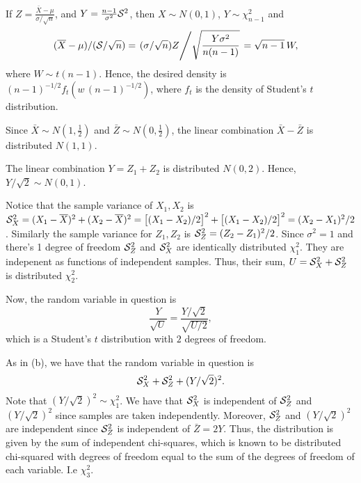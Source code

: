 \documentclass{stat_homework}
\begin{document}

If $Z = \frac{\bar X - \mu}{\sigma/\sqrt n}$, and $Y = \frac{n-1}{\sigma^2} \mathcal S^2$, then $X \sim N(0,1)$, $Y \sim \chi^2_{n-1}$ and
\begin{align*}
  (\overline X - \mu)/(\mathcal S/\sqrt n) 
  &= \left. (\sigma/\sqrt n) Z \middle/ \sqrt{\frac{Y\sigma^2}{n(n-1)}} \right. 
  = \sqrt{n-1} \, W,
\end{align*}
where $W \sim t(n-1)$.  Hence, the desired density is $(n-1)^{-1/2}f_t(w \,(n-1)^{-1/2})$, where $f_t$ is the density of Student's $t$ distribution. 

\newpage



Since $\bar X\sim N(1,\frac 12)$ and $\bar Z \sim N(0,\frac 12)$, the linear combination $\bar X - \bar Z$ is distributed $N(1,1)$.


The linear combination $Y = Z_1 + Z_2$ is distributed $N(0,2)$. Hence, $Y/\sqrt2 \sim N(0,1)$.

Notice that the sample variance of $X_1,X_2$ is $\mathcal S_X^2=(X_1 - \overline X)^2 + (X_2 - \overline X)^2 = \big[(X_1 - X_2)/2\big]^2+\big[(X_1 - X_2)/2\big]^2 = (X_2 - X_1)^2/2$.  Similarly the sample variance for $Z_1,Z_2$ is $\mathcal S_Z^2=(Z_2 - Z_1)^2/2$. Since $\sigma^2=1$ and there's 1 degree of freedom $\mathcal S^2_Z$ and $\mathcal S^2_X$ are identically distributed $\chi^2_1$. They are indepenent as functions of independent samples.  Thus, their sum, $U = \mathcal S_X^2 + \mathcal S_Z^2$ is distributed $\chi^2_2$. 

Now, the random variable in question is
$$
  \frac{Y}{\sqrt{U}} = \frac{Y/\sqrt 2}{\sqrt{U/2}},
$$
which is a Student's $t$ distribution with $2$ degrees of freedom.


As in (b), we have that the random variable in question is
$$
  \mathcal S_X^2 + \mathcal S_Z^2 + (Y/\sqrt2)^2.
$$
Note that $(Y/\sqrt2)^2\sim\chi^2_1$.  We have that $\mathcal S_X^2$ is independent of $\mathcal S_Z^2$ and $(Y/\sqrt 2)^2$ since samples are taken independently.  Moreover, $\mathcal S_Z^2$ and $(Y/\sqrt2)^2$ are independent since $\mathcal S_Z^2$ is independent of $\bar Z = 2 Y$.  Thus, the distribution is given by the sum of independent chi-squares, which is known to be distributed chi-squared with degrees of freedom equal to the sum of the degrees of freedom of each variable.  I.e $\chi^2_3$. 
\end{document}
